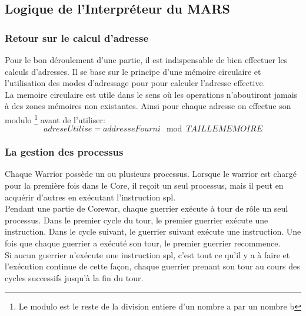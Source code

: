 \documentclass[12pt]{article}
\begin{document}


\subsection{Logique de l'Interpréteur du MARS}
\subsubsection*{Retour sur le calcul d’adresse}
Pour le bon déroulement d'une partie, il est indispensable de bien effectuer les calculs d'adresses. Il se base sur le principe d'une mémoire
circulaire et l'utilisation des modes d'adressage pour pour calculer l'adresse effective.\\
La memoire circulaire est utile dans le sens où les operations n'aboutiront jamais à des zones mémoires non existantes. Ainsi 
pour chaque adresse on effectue son modulo \footnote{Le modulo est le reste de la division entiere d'un nombre a par un nombre b} avant de l'utiliser:\\
\[\boxed{adreseUtilise=addresseFourni \mod TAILLEMEMOIRE}\]
\subsubsection*{La gestion des processus}
Chaque Warrior possède un ou plusieurs processus. Lorsque le warrior est chargé pour la première fois dans le Core, 
il reçoit un seul processus, mais il peut en acquérir d'autres en exécutant l'instruction spl.\\

Pendant une partie de Corewar, chaque guerrier exécute à tour de rôle un seul processus. Dans le premier cycle du tour, 
le premier guerrier exécute une instruction. Dans le cycle suivant, le guerrier suivant exécute une instruction. 
Une fois que chaque guerrier a exécuté son tour, le premier guerrier recommence.\\

Si aucun guerrier n'exécute une instruction spl, c'est tout ce qu'il y a à faire et 
l'exécution continue de cette façon, chaque guerrier prenant son tour au cours des cycles successifs 
jusqu'à la fin du tour.\\
\end{document}
